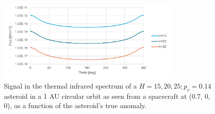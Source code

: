 \begin{figure}[htbp]
 \centering
 \includegraphics[width=0.8\textwidth]{img/implementation_tir_signal.pdf}
 \caption{Signal in the thermal infrared spectrum of a $H=15, 20, 25; p_v=0.14$ asteroid in a 1 AU circular orbit as seen from a spacecraft at (0.7, 0, 0), as a function of the asteroid's true anomaly.}
 \label{fig:thermal_signal_implementation}
\end{figure}

